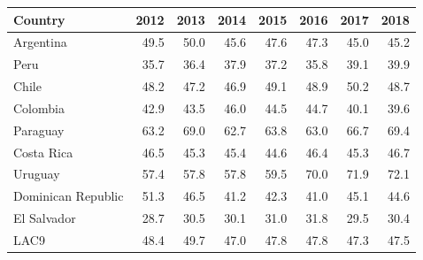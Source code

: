 \begin{tabular}{lrrrrrrr}
\toprule
Country & 2012 & 2013 & 2014 & 2015 & 2016 & 2017 & 2018 \\
\midrule
Argentina & 49.5 & 50.0 & 45.6 & 47.6 & 47.3 & 45.0 & 45.2 \\
Peru & 35.7 & 36.4 & 37.9 & 37.2 & 35.8 & 39.1 & 39.9 \\
Chile & 48.2 & 47.2 & 46.9 & 49.1 & 48.9 & 50.2 & 48.7 \\
Colombia & 42.9 & 43.5 & 46.0 & 44.5 & 44.7 & 40.1 & 39.6 \\
Paraguay & 63.2 & 69.0 & 62.7 & 63.8 & 63.0 & 66.7 & 69.4 \\
Costa Rica & 46.5 & 45.3 & 45.4 & 44.6 & 46.4 & 45.3 & 46.7 \\
Uruguay & 57.4 & 57.8 & 57.8 & 59.5 & 70.0 & 71.9 & 72.1 \\
Dominican Republic & 51.3 & 46.5 & 41.2 & 42.3 & 41.0 & 45.1 & 44.6 \\
El Salvador & 28.7 & 30.5 & 30.1 & 31.0 & 31.8 & 29.5 & 30.4 \\
\midrule
LAC9 & 48.4 & 49.7 & 47.0 & 47.8 & 47.8 & 47.3 & 47.5 \\
\bottomrule
\end{tabular}
